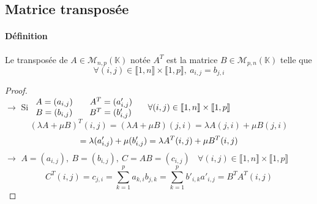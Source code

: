 	\subsection{Matrice transposée}
		\traitd
		\paragraph{Définition}
			Le transposée de $A\in\mathcal{M}_{n,p} (\mathbb{K} )$ notée $A^T$ est la matrice 
			$B\in\mathcal{M}_{p,n} (\mathbb{K} )$ telle que
			\[\forall (i,j) \in \llbracket 1,n\rrbracket \times \llbracket 1,p \rrbracket ,~
			a_{i,j}=b_{j,i} \] \trait
		\begin{proof} ${}$\\
		\hspace*{30pt} $\rightarrow$ Si $\begin{array}{l} A = (a_{i,j}) 
		\hspace*{20pt} A^T = (a'_{i,j})\\ B = (b_{i,j}) \hspace*{20pt}
		B^T = (b'_{i,j}) \end{array} ~~~~
		\forall (i,j)\in \llbracket 1,n\rrbracket \times \llbracket 1,p \rrbracket $
		\[(\lambda A +\mu B)^T(i,j) = (\lambda A +\mu B)(j,i) 
		= \lambda A(j,i) + \mu B(j,i)\]  \[= \lambda (a'_{i,j}) 
		+\mu (b'_{i,j}) = \lambda A^T(i,j) + \mu B^T(i,j)\vspace*{20pt} \]
		\hspace*{30pt} $\rightarrow$ $A = (a_{i,j}),~B = (b_{i,j}),~C = AB = (c_{i,j})
		~~~~\forall (i,j)\in \llbracket 1,n\rrbracket \times \llbracket 1,p \rrbracket $
		\[C^T(i,j) = c_{j,i} = \sum\limits_{k=1}^p a_{k,i} b_{j,k}
		=\sum\limits_{k=1}^p b'_{i,k} a'_{i,j} = B^TA^T(i,j)\]
		\end{proof}
